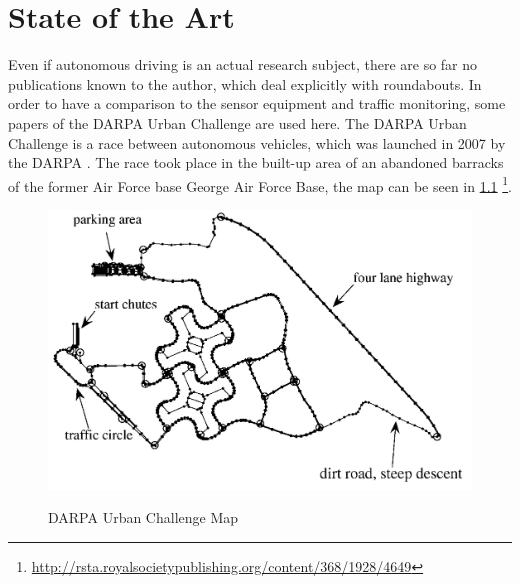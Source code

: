 \documentclass[11pt,oneside,openright]{mpreport}
\begin{document}
\chapter{State of the Art}
Even if autonomous driving is an actual research subject, there are so far no publications known to the author, which deal explicitly with roundabouts.
In order to have a comparison to the sensor equipment and traffic monitoring, some papers of the \acs{DARPA} Urban Challenge are used here. 
The DARPA Urban Challenge is a race between autonomous vehicles, which was launched in 2007 by the \ac{DARPA} \cite {Buehler2010}.
The race took place in the built-up area of an abandoned barracks of the former Air Force base George Air Force Base, the map can be seen in \cref{darpa_map}
\footnote{\url{http://rsta.royalsocietypublishing.org/content/368/1928/4649}}.

\begin{figure}[!ht]
\caption{ \acs{DARPA} Urban Challenge Map }
\includegraphics[width=\textwidth]{bilder/darpa_map_bw.png}
\label{darpa_map}
\end{figure}
\end{document}
